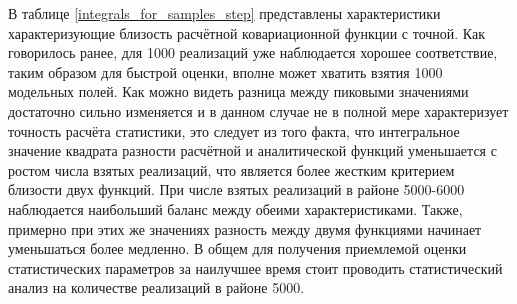 В таблице \ref{integrals_for_samples_step} представлены характеристики характеризующие близость расчётной ковариационной функции с точной. Как говорилось ранее, для 1000 реализаций уже наблюдается хорошее соответствие, таким образом для быстрой оценки, вполне может хватить взятия 1000 модельных полей. Как можно видеть разница между пиковыми значениями достаточно сильно изменяется и в данном случае не в полной мере характеризует точность расчёта статистики, это следует из того факта, что интегральное значение квадрата разности расчётной и аналитической функций уменьшается с ростом числа взятых реализаций, что является более жестким критерием близости двух функций. При числе взятых реализаций в районе 5000-6000 наблюдается наибольший баланс между обеими характеристиками. Также, примерно при этих же значениях разность между двумя функциями начинает уменьшаться более медленно. В общем для получения приемлемой оценки статистических параметров за наилучшее время стоит проводить статистический анализ на количестве реализаций в районе 5000.

